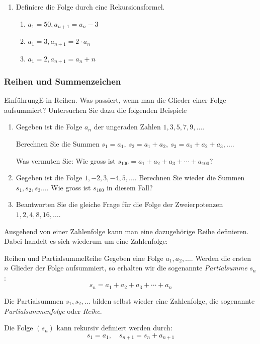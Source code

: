 \begin{enumerate}
    \item Definiere die Folge durch eine Rekursionsformel.
    \begin{enumerate}
        \item $a_1 = 50, a_{n+1} = a_n - 3 $
        \item $a_1 = 3, a_{n+1} = 2\cdot a_n $
        \item $a_1 = 2, a_{n+1} = a_n + n $
    \end{enumerate}
\end{enumerate}









\clearpage
\subsubsection{Reihen und Summenzeichen}
\begin{LA}
    {Einführung}{E-in-Reihen.}
    Was passiert, wenn man die Glieder einer Folge aufsummiert? Untersuchen Sie dazu die folgenden Beispiele
    \begin{enumerate}
        \item Gegeben ist die Folge $a_n$ der ungeraden Zahlen $1, 3, 5, 7, 9, \dots $.

        Berechnen Sie die Summen $s_1=a_1,\  s_2 = a_1+a_2,\  s_3=a_1+a_2+a_3, \dots$.

        Was vermuten Sie: Wie gross ist $s_{100} = a_1+a_2+a_3 + \cdots + a_{100}$?
        \item Gegeben ist die Folge $1, -2, 3, -4, 5, \dots $. Berechnen Sie wieder die Summen $s_1, s_2, s_3 \dots$. Wie gross ist $s_{100}$ in diesem Fall?
        \item Beantworten Sie die gleiche Frage für die Folge der Zweierpotenzen $1, 2, 4, 8, 16, \dots$.
    \end{enumerate}
\end{LA}

\clearpage
Ausgehend von einer Zahlenfolge kann man eine dazugehörige Reihe definieren. Dabei handelt es sich wiederum um eine Zahlenfolge:
\begin{definition}
    {Reihen und Partialsumme}{Reihe}
Gegeben eine Folge $a_1,a_2,\dots $. Werden die ersten $n$ Glieder der Folge aufsummiert, so erhalten wir die sogenannte \emph{Partialsumme} $s_n$:
$$ s_n = a_1+a_2+a_3 + \cdots + a_{n}$$

Die Partialsummen $s_1,s_2,\dots$ bilden selbst wieder eine Zahlenfolge, die sogenannte \emph{Partialsummenfolge} oder \emph{Reihe}.

Die Folge $(s_n)$ kann rekursiv definiert werden durch:
$$s_1=a_1,\quad  s_{n+1}=s_n + a_{n+1} $$


\end{definition}

